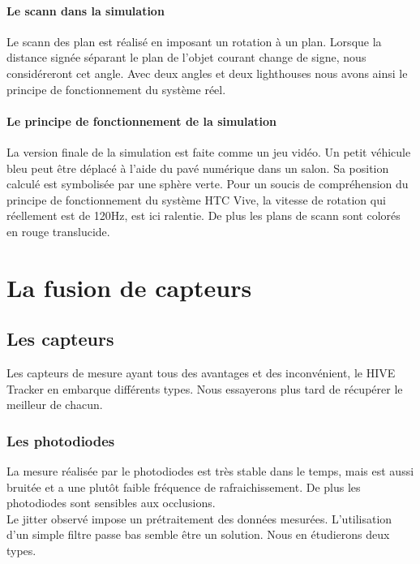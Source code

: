 \documentclass[10pt]{report}
\begin{document}
\subsubsection{Le scann dans la simulation}

Le scann des plan est réalisé en imposant un rotation à un plan. Lorsque la distance signée séparant le plan de l'objet courant change de signe, nous considéreront cet angle. Avec deux angles et deux lighthouses nous avons ainsi le principe de fonctionnement du système réel.

\subsubsection{Le principe de fonctionnement de la simulation}

La version finale de la simulation est faite comme un jeu vidéo. Un petit véhicule bleu peut être déplacé à l'aide du pavé numérique dans un salon. Sa position calculé est symbolisée par une sphère verte. Pour un soucis de compréhension du principe de fonctionnement du système HTC Vive, la vitesse de rotation qui réellement est de 120Hz, est ici ralentie. De plus les plans de scann sont colorés en rouge translucide.

\chapter{La fusion de capteurs}

\section{Les capteurs}

Les capteurs de mesure ayant tous des avantages et des inconvénient, le HIVE Tracker en embarque différents types. Nous essayerons plus tard de récupérer le meilleur de chacun.

\subsection{Les photodiodes}

La mesure réalisée par le photodiodes est très stable dans le temps, mais est aussi bruitée et a une plutôt faible fréquence de rafraichissement. De plus les photodiodes sont sensibles aux occlusions.\\

Le jitter observé impose un prétraitement des données mesurées. L'utilisation d'un simple filtre passe bas semble être un solution. Nous en étudierons deux types.
\end{document}
